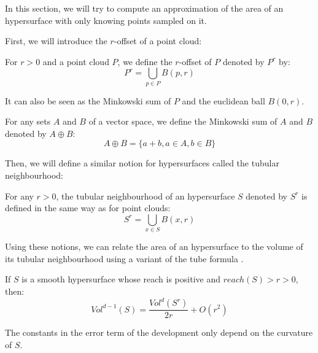 In this section, we will try to compute an approximation of the area of an
hypersurface with only knowing points sampled on it.

First, we will introduce the $r$-offset of a point cloud:

\begin{definition}
    For $ r > 0 $ and a point cloud $ P $, we define the $r$-offset of $ P $
    denoted by $ P^r $ by:
    $$ P^r = \bigcup_{p \in P} B(p, r)$$
\end{definition}

It can also be seen as the Minkowski sum of $ P $ and the euclidean ball $ B(0,
r) $.

\begin{definition}
    For any sets $ A $ and $ B $ of a vector space, we define the Minkowski sum
    of $ A $ and $ B $ denoted by $ A \oplus B $:
    $$ A \oplus B = \{ a + b, a \in A, b \in B \} $$
    \label{def:minkowski-sum}
\end{definition}

Then, we will define a similar notion for hypersurfaces called the tubular
neighbourhood:

\begin{definition}
    For any $ r > 0 $, the tubular neighbourhood of an hypersurface $ S $
    denoted by $ S^r $ is defined in the same way as for point clouds:
    $$ S^r = \bigcup_{x \in S} B(x, r) $$
\end{definition}

Using these notions, we can relate the area of an hypersurface to the volume of
its tubular neighbourhood using a variant of the tube formula \cite{weyl1939volume}.

\begin{proposition}
    \label{prop:comp-offset-area}
    If $ S $ is a smooth hypersurface whose reach is positive and $ reach(S) > r
    > 0 $, then: $$ Vol^{d-1}(S) = \frac{Vol^d(S^r)}{2r} + O(r^2) $$

    The constants in the error term of the development only depend on the curvature
    of $ S $.
\end{proposition}

